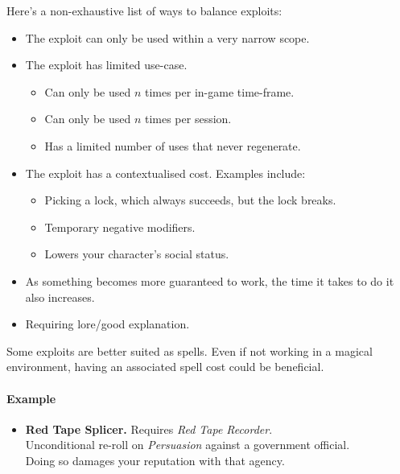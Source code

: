 Here's a non-exhaustive list of ways to balance exploits:
\begin{itemize}
    \item The exploit can only be used within a very narrow scope.
    \item The exploit has limited use-case.
    \begin{itemize}
        \item Can only be used $n$ times per in-game time-frame.
        \item Can only be used $n$ times per session.
        \item Has a limited number of uses that never regenerate.
    \end{itemize}
    \item The exploit has a contextualised cost. Examples include:
    \begin{itemize}
        \item Picking a lock, which always succeeds, but the lock breaks.
        \item Temporary negative modifiers.
        \item Lowers your character's social status.
    \end{itemize}
    \item As something becomes more guaranteed to work, the time it takes to do it also increases.
    \item Requiring lore/good explanation.
\end{itemize}

Some exploits are better suited as spells. 
Even if not working in a magical environment, having an associated spell cost could be beneficial.

\paragraph{Example}
\begin{itemize}
    \item \textbf{Red Tape Splicer.} Requires \textit{Red Tape Recorder}.\\
    Unconditional re-roll on \textit{Persuasion} against a government official.\\
    Doing so damages your reputation with that agency.
\end{itemize}